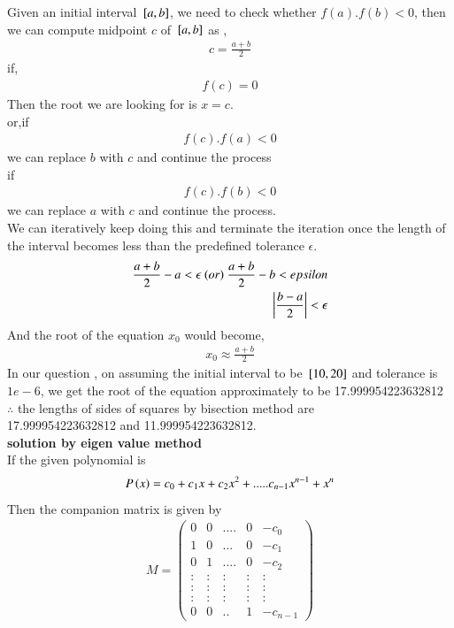 \documentclass[journal]{IEEEtran}
\begin{document}
Given an initial interval ${}\left[a,b\right]$, we need to check whether $f(a).f(b)<0$, then we can compute midpoint $c$ of ${}\left[a,b\right]$ as ,
\begin{align}
    c = \frac{a + b}{2}
\end{align}
if, 
\begin{align}
    f(c) = 0
\end{align}
Then the root we are looking for is $x = c$.\\
or,if
\begin{align}
    f(c).f(a) < 0
\end{align}
we can replace $b$ with $c$ and continue the process\\
if
\begin{align}
    f(c).f(b) < 0
\end{align}
we can replace $a$ with $c$ and continue the process.\\
We can iteratively keep doing this and terminate the iteration once the length of the interval becomes less than the predefined tolerance $\epsilon$.
\begin{align}
\frac{a + b}{2} - a < \epsilon \ (or) \ \frac{a + b}{2} - b < epsilon\\
    \left\vert\frac{b - a}{2}\right\vert < \epsilon
\end{align}
And the root of the equation $x_0$ would become,
\begin{align}
    x_0 \approx \frac{a + b}{2}
\end{align}
In our question , on assuming the initial interval to be ${}\left[10,20\right]$ and tolerance is $1e-6$,
we get the root of the equation approximately to be 17.999954223632812\\
$\therefore$ the lengths of sides of squares by bisection method are\\ 17.999954223632812 and 11.999954223632812.\\
\textbf{solution by eigen value method}
\\
If the given polynomial is 
\begin{align}
    P\left(x\right) = c_0 + c_1x + c_2x^2 +..... c_{n-1}x^{n-1} + x^n
\end{align}
Then the companion matrix is given by
\begin{align}
    M = \begin{pmatrix}
        0 & 0 &....& 0 & -c_0\\
        1 & 0 & ...& 0 & -c_1\\
        0 & 1 &....& 0 & -c_2\\
        : & : & : & : &  :\\
        : & :& : & :&:\\
        :&:&:&:&:\\
        0&0&..&1& -c_{n-1}  
    \end{pmatrix}
\end{align}
\end{document}
